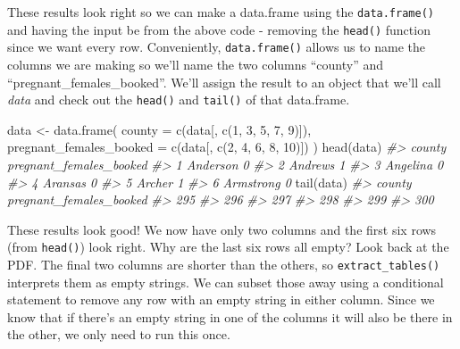 \documentclass[
]{krantz}
\makeatletter
\newenvironment{Shaded}{\begin{snugshade}}{\end{snugshade}}
\newcommand{\AttributeTok}[1]{\textcolor[rgb]{0.61,0.61,0.61}{#1}}
\newcommand{\CommentTok}[1]{\textcolor[rgb]{0.37,0.37,0.37}{\textit{#1}}}
\newcommand{\DecValTok}[1]{\textcolor[rgb]{0.06,0.06,0.06}{#1}}
\newcommand{\FunctionTok}[1]{\textcolor[rgb]{0,0,0}{#1}}
\newcommand{\NormalTok}[1]{#1}
\newcommand{\OtherTok}[1]{\textcolor[rgb]{0.37,0.37,0.37}{#1}}
\newenvironment{kframe}{%
\medskip{}
\setlength{\fboxsep}{.8em}
 \def\at@end@of@kframe{}%
 \ifinner\ifhmode%
  \def\at@end@of@kframe{\end{minipage}}%
  \begin{minipage}{\columnwidth}%
 \fi\fi%
 \def\FrameCommand##1{\hskip\@totalleftmargin \hskip-\fboxsep
 \colorbox{shadecolor}{##1}\hskip-\fboxsep
     \hskip-\linewidth \hskip-\@totalleftmargin \hskip\columnwidth}%
 \MakeFramed {\advance\hsize-\width
   \@totalleftmargin\z@ \linewidth\hsize
   \@setminipage}}%
 {\par\unskip\endMakeFramed%
 \at@end@of@kframe}
\renewenvironment{Shaded}{\begin{kframe}}{\end{kframe}}
\makeatother
\begin{document}
These results look right so we can make a data.frame using
the \texttt{data.frame()} and having the input be from the
above code - removing the \texttt{head()} function since we
want every row. Conveniently, \texttt{data.frame()} allows
us to name the columns we are making so we'll name the two
columns ``county'' and ``pregnant\_females\_booked''. We'll
assign the result to an object that we'll call \emph{data}
and check out the \texttt{head()} and \texttt{tail()} of
that data.frame.

\begin{Shaded}
\begin{Highlighting}[]
\NormalTok{data }\OtherTok{\textless{}{-}} \FunctionTok{data.frame}\NormalTok{(}
  \AttributeTok{county =} \FunctionTok{c}\NormalTok{(data[, }\FunctionTok{c}\NormalTok{(}\DecValTok{1}\NormalTok{, }\DecValTok{3}\NormalTok{, }\DecValTok{5}\NormalTok{, }\DecValTok{7}\NormalTok{, }\DecValTok{9}\NormalTok{)]),}
  \AttributeTok{pregnant\_females\_booked =} \FunctionTok{c}\NormalTok{(data[, }\FunctionTok{c}\NormalTok{(}\DecValTok{2}\NormalTok{, }\DecValTok{4}\NormalTok{, }\DecValTok{6}\NormalTok{, }\DecValTok{8}\NormalTok{, }\DecValTok{10}\NormalTok{)])}
\NormalTok{)}
\FunctionTok{head}\NormalTok{(data)}
\CommentTok{\#\textgreater{}      county pregnant\_females\_booked}
\CommentTok{\#\textgreater{} 1  Anderson                       0}
\CommentTok{\#\textgreater{} 2   Andrews                       1}
\CommentTok{\#\textgreater{} 3  Angelina                       0}
\CommentTok{\#\textgreater{} 4   Aransas                       0}
\CommentTok{\#\textgreater{} 5    Archer                       1}
\CommentTok{\#\textgreater{} 6 Armstrong                       0}
\FunctionTok{tail}\NormalTok{(data)}
\CommentTok{\#\textgreater{}     county pregnant\_females\_booked}
\CommentTok{\#\textgreater{} 295                               }
\CommentTok{\#\textgreater{} 296                               }
\CommentTok{\#\textgreater{} 297                               }
\CommentTok{\#\textgreater{} 298                               }
\CommentTok{\#\textgreater{} 299                               }
\CommentTok{\#\textgreater{} 300}
\end{Highlighting}
\end{Shaded}

These results look good! We now have only two columns and
the first six rows (from \texttt{head()}) look right. Why
are the last six rows all empty? Look back at the PDF. The
final two columns are shorter than the others, so
\texttt{extract\_tables()} interprets them as empty strings.
We can subset those away using a conditional statement to
remove any row with an empty string in either column. Since
we know that if there's an empty string in one of the
columns it will also be there in the other, we only need to
run this once.
\end{document}
